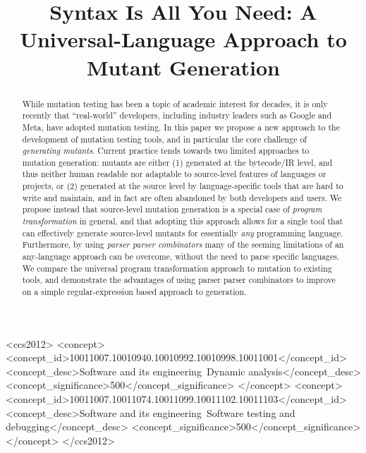 \documentclass[sigconf,review, anonymous]{acmart}
\title{Syntax Is All You Need: A Universal-Language Approach to Mutant Generation}
\begin{document}
\begin{abstract}
While mutation testing has been a topic of academic interest for
decades, it is only recently that ``real-world'' developers, including
industry leaders such as Google and Meta, have adopted mutation
testing.  In this paper we propose a new approach to the development of mutation
testing tools, and in particular the core challenge of
\emph{generating mutants}.  Current practice tends towards two
limited approaches to mutation generation: mutants are either (1)
generated at the bytecode/IR level, and thus neither human readable
nor adaptable to source-level features of languages or projects, or
(2) generated at the source level by language-specific tools that are
hard to write and maintain, and in fact are often abandoned by both
developers and users.  We propose instead that source-level mutation
generation is a special case of \emph{program transformation} in
general, and that adopting this approach allows for a single tool that
can effectively generate source-level mutants for essentially
\emph{any} programming language. Furthermore, by using \emph{parser
  parser combinators} many of the seeming limitations of an
any-language approach can be overcome, without the need to parse
specific languages.  We compare the universal program transformation
approach to mutation to existing tools, and demonstrate the advantages
of using parser parser combinators to improve on a simple regular-expression
based approach to generation.  
\end{abstract}


\begin{CCSXML}
<ccs2012>
<concept>
<concept_id>10011007.10010940.10010992.10010998.10011001</concept_id>
<concept_desc>Software and its engineering~Dynamic analysis</concept_desc>
<concept_significance>500</concept_significance>
</concept>
<concept>
<concept_id>10011007.10011074.10011099.10011102.10011103</concept_id>
<concept_desc>Software and its engineering~Software testing and debugging</concept_desc>
<concept_significance>500</concept_significance>
</concept>
</ccs2012>
\end{CCSXML}


\maketitle
\end{document}
